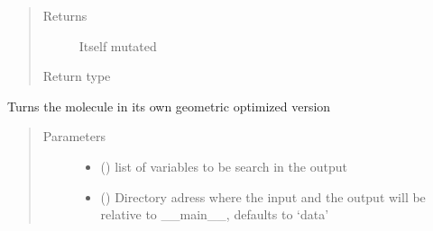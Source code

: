 \documentclass[letterpaper,10pt,english]{sphinxmanual}
\begin{document}
\begin{fulllineitems}
\begin{fulllineitems}
\begin{quote}
\begin{description}
\item[{Returns}] \leavevmode
\sphinxAtStartPar
Itself mutated

\item[{Return type}] \leavevmode
\sphinxAtStartPar
{\hyperref[\detokenize{molecular:molecular.Molecule}]{}}

\end{description}\end{quote}

\end{fulllineitems}


\begin{fulllineitems}
\label{\detokenize{molecular:molecular.Molecule.optg}}
\sphinxAtStartPar
Turns the molecule in its own geometric optimized version
\begin{quote}\begin{description}
\item[{Parameters}] \leavevmode\begin{itemize}
\item {} 
\sphinxAtStartPar
{} (\sphinxstyleliteralemphasis{\sphinxupquote{{[}}}\sphinxstyleliteralemphasis{\sphinxupquote{{]}}}) \textendash{} list of variables to be search in the output

\item {} 
\sphinxAtStartPar
{} (\sphinxstyleliteralemphasis{\sphinxupquote{, }}) \textendash{} Directory adress where the input and the output will be relative to \_\_main\_\_, defaults to
‘data’


\end{itemize}
\end{description}
\end{quote}
\end{fulllineitems}
\end{fulllineitems}
\end{document}
